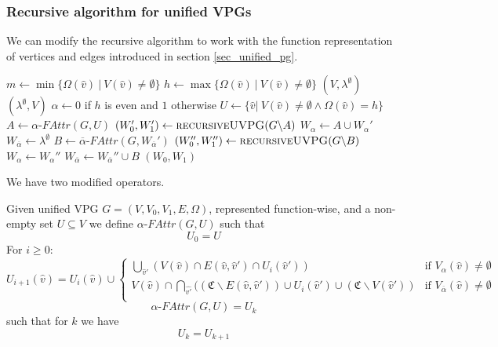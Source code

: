 \subsubsection{Recursive algorithm for unified VPGs}
We can modify the recursive algorithm to work with the function representation of vertices and edges introduced in section \ref{sec_unified_pg}.
\begin{algorithm}[h]
	\caption{$\textsc{recursiveUVPG}(\textit{PG } G = (\\
		V : \hat{V} \rightarrow 2^\mathfrak{C},\\
		V_0 : \hat{V} \rightarrow 2^\mathfrak{C},\\
		V_1 : \hat{V} \rightarrow 2^\mathfrak{C},\\
		E : \hat{E} \rightarrow 2^\mathfrak{C},\\
		\Omega : \hat{V} \rightarrow \mathbb{N}))$}
	\begin{algorithmic}[1]
		\State $m \gets \min\{ \Omega(\hat{v})\ |\ V(\hat{v}) \neq \emptyset \}$
		\State $h \gets \max\{ \Omega(\hat{v})\ |\ V(\hat{v}) \neq \emptyset \}$
		\State \Return $(V,\lambda^\emptyset)$
		\Else
		\State \Return $(\lambda^\emptyset, V)$
		\EndIf
		\EndIf
		\State $\alpha \gets 0$ if $h$ is even and $1$ otherwise
		\State $U \gets \{ \hat{v} |\ V(\hat{v}) \neq \emptyset \wedge \Omega(\hat{v}) = h\}$
		\State $A \gets \alpha\textit{-FAttr}(G, U)$
		\State $(W_0', W_1') \gets \textsc{recursiveUVPG}(G \backslash A)$
		\State $W_\alpha \gets A \cup W_\alpha'$
		\State $W_{\overline{\alpha}} \gets \lambda^\emptyset$
		\Else
		\State $B \gets \overline{\alpha}\textit{-FAttr}(G,W_{\overline{\alpha}}')$
		\State $(W_0'', W_1'') \gets \textsc{recursiveUVPG}(G \backslash B)$
		\State $W_\alpha \gets W_\alpha''$
		\State $W_{\overline{\alpha}} \gets W_{\overline{\alpha}}'' \cup B$
		\EndIf
		\State \Return $(W_0, W_1)$
	\end{algorithmic}
\end{algorithm}
We have two modified operators.
\begin{definition}
		\label{def_Uattr}Given unified VPG $G = (V, V_0,V_1,E,\Omega)$, represented function-wise, and a non-empty set $U \subseteq V$ we define $\alpha\textit{-FAttr}(G,U)$ such that
	\[U_0 = U \]
	For $i \geq 0$:
	\[
	U_{i+1}(\hat{v}) = U_i(\hat{v}) \cup \begin{cases}
\bigcup_{\hat{v}'} (V(\hat{v}) \cap E(\hat{v},\hat{v}') \cap U_i(\hat{v}')) & \text{if } V_{\alpha}(\hat{v}) \neq \emptyset \\
V(\hat{v}) \cap \bigcap_{\hat{v'}}((\mathfrak{C} \backslash E(\hat{v},\hat{v}')) \cup U_i(\hat{v}') \cup (\mathfrak{C}\backslash V(\hat{v}')) & \text{if } V_{\overline{\alpha}}(\hat{v}) \neq \emptyset \\
	\end{cases}
	\]
	\[\alpha\textit{-FAttr}(G,U) = U_k \]
	such that for $k$ we have
	\[U_k = U_{k+1} \]
\end{definition}

